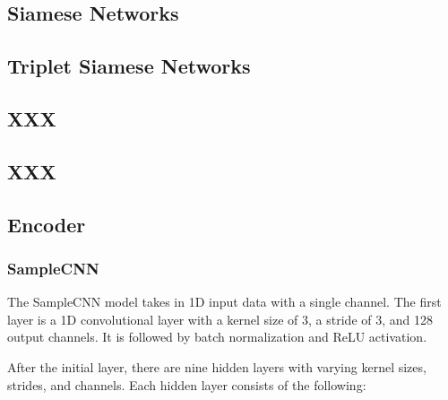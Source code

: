 \subsection{Siamese Networks}
\subsection{Triplet Siamese Networks}
\subsection{XXX}
\subsection{XXX}

\subsection{Encoder}
\subsubsection{SampleCNN}

The SampleCNN model \cite{CLMR2021} takes in 1D input data with a single channel. The first layer is a 1D convolutional layer with a kernel size of 3, a stride of 3, and 128 output channels. It is followed by batch normalization and ReLU activation.

After the initial layer, there are nine hidden layers with varying kernel sizes, strides, and channels. Each hidden layer consists of the following:

